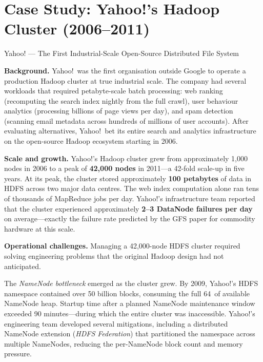 \section{Case Study: Yahoo!'s Hadoop Cluster (2006--2011)}
\label{sec:yahoo-case}

\begin{casestudy}{Yahoo! --- The First Industrial-Scale Open-Source Distributed File System}

\textbf{Background.}
Yahoo!\ was the first organisation outside Google to operate a
production Hadoop cluster at true industrial scale. The company had
several workloads that required petabyte-scale batch processing: web
ranking (recomputing the search index nightly from the full crawl),
user behaviour analytics (processing billions of page views per day),
and spam detection (scanning email metadata across hundreds of millions
of user accounts). After evaluating alternatives, Yahoo!\ bet its
entire search and analytics infrastructure on the open-source Hadoop
ecosystem starting in 2006.

\smallskip
\textbf{Scale and growth.}
Yahoo!'s Hadoop cluster grew from approximately 1,000 nodes in 2006
to a peak of \textbf{42,000 nodes} in 2011---a 42-fold scale-up in
five years. At its peak, the cluster stored approximately \textbf{100
petabytes} of data in HDFS across two major data centres. The web
index computation alone ran tens of thousands of MapReduce jobs per
day. Yahoo!'s infrastructure team reported that the cluster
experienced approximately \textbf{2--3 DataNode failures per day} on
average---exactly the failure rate predicted by the GFS paper for
commodity hardware at this scale.

\smallskip
\textbf{Operational challenges.}
Managing a 42,000-node HDFS cluster required solving engineering
problems that the original Hadoop design had not anticipated.

The \emph{NameNode bottleneck} emerged as the cluster grew. By 2009,
Yahoo!'s HDFS namespace contained over 50 billion blocks, consuming
the full 64\GB\ of available NameNode heap. Startup time after a
planned NameNode maintenance window exceeded 90 minutes---during
which the entire cluster was inaccessible. Yahoo!'s engineering team
developed several mitigations, including a distributed NameNode
extension (\emph{HDFS Federation}) that partitioned the namespace
across multiple NameNodes, reducing the per-NameNode block count and
memory pressure.


\end{casestudy}
